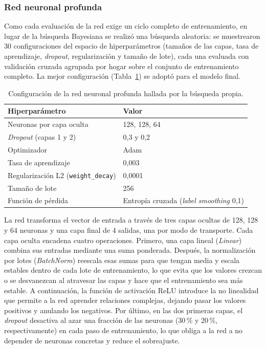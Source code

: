 \newpage

\subsubsection*{Red neuronal profunda}

Como cada evaluación de la red exige un ciclo completo de entrenamiento, en lugar de la búsqueda Bayesiana se realizó una búsqueda aleatoria: se muestrearon 30 configuraciones del espacio de hiperparámetros (tamaños de las capas, tasa de aprendizaje, \textit{dropout}, regularización y tamaño de lote), cada una evaluada con validación cruzada agrupada por hogar sobre el conjunto de entrenamiento completo. La mejor configuración (Tabla~\ref{tab:dnn_params}) se adoptó para el modelo final.

\begin{table}[htbp]
  \caption{Configuración de la red neuronal profunda hallada por la búsqueda propia.}
  \label{tab:dnn_params}
  \centering
  \begin{tabular}{ll}
    \toprule
    \textbf{Hiperparámetro} & \textbf{Valor} \\
    \midrule
    Neuronas por capa oculta & 128, 128, 64 \\
    \textit{Dropout} (capas 1 y 2) & 0,3 y 0,2 \\
    Optimizador              & Adam \\
    Tasa de aprendizaje      & 0,003 \\
    Regularización L2 (\texttt{weight\_decay}) & 0,0001 \\
    Tamaño de lote           & 256 \\
    Función de pérdida       & Entropía cruzada (\textit{label smoothing} 0,1) \\
    \bottomrule
  \end{tabular}
\end{table}

La red transforma el vector de entrada a través de tres capas ocultas de 128, 128 y 64 neuronas y una capa final de 4 salidas, una por modo de transporte. Cada capa oculta encadena cuatro operaciones. Primero, una capa lineal (\textit{Linear}) combina sus entradas mediante una suma ponderada. Después, la normalización por lotes (\textit{BatchNorm}) reescala esas sumas para que tengan media y escala estables dentro de cada lote de entrenamiento, lo que evita que los valores crezcan o se desvanezcan al atravesar las capas y hace que el entrenamiento sea más estable. A continuación, la función de activación ReLU introduce la no linealidad que permite a la red aprender relaciones complejas, dejando pasar los valores positivos y anulando los negativos. Por último, en las dos primeras capas, el \textit{dropout} desactiva al azar una fracción de las neuronas (30\,\% y 20\,\%, respectivamente) en cada paso de entrenamiento, lo que obliga a la red a no depender de neuronas concretas y reduce el sobreajuste.

